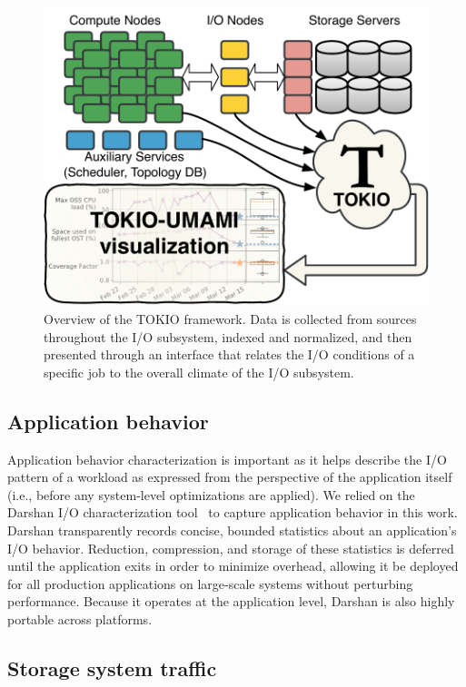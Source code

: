 \begin{figure}[t]
    \centering
    \includegraphics[width=.9\columnwidth]{figs/tokio-schematic.pdf}
    \caption{Overview of the TOKIO framework.  Data is collected from sources
    throughout the I/O subsystem, indexed and normalized, and then presented
    through an interface that relates the I/O conditions of a specific job to the overall climate of the I/O subsystem.}
    \label{fig:tokio-schematic}
\vspace{-.2in}
\end{figure}

\subsection{Application behavior} \label{sec:methods/darshan}

Application behavior characterization is important as it helps describe the I/O pattern of a workload as expressed from the perspective of the application itself (i.e., before any system-level optimizations are applied).
We relied on the Darshan I/O characterization tool~\cite{carns200924}
to capture application behavior in this work.  Darshan transparently records concise, bounded statistics about an application's I/O behavior.
Reduction, compression, and storage of these statistics is deferred until the
application exits in order to minimize overhead, allowing it be deployed for
all production applications on large-scale systems without perturbing
performance.  Because it operates at the application level, Darshan is also
highly portable across platforms.

\subsection{Storage system traffic} \label{sec:methods/storagesystraffic}

